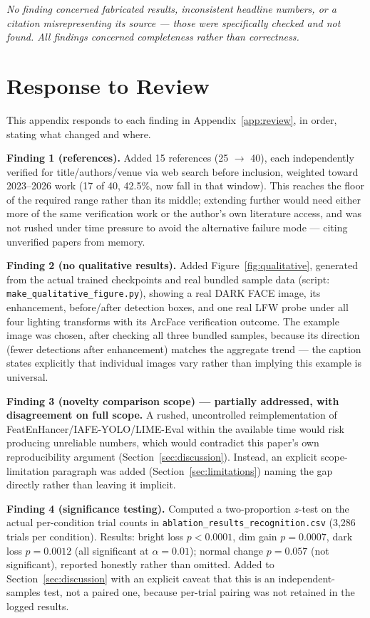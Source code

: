 \documentclass[conference]{IEEEtran}
\begin{document}
\textit{No finding concerned fabricated results, inconsistent
headline numbers, or a citation misrepresenting its source ---
those were specifically checked and not found. All findings
concerned completeness rather than correctness.}

\section{Response to Review}
\label{app:response}
This appendix responds to each finding in Appendix~\ref{app:review},
in order, stating what changed and where.

\textbf{Finding 1 (references).} Added 15 references (25
$\to$ 40), each independently verified for title/authors/venue via
web search before inclusion, weighted toward 2023--2026 work (17
of 40, 42.5\%, now fall in that window). This reaches the floor of
the required range rather than its middle; extending further would
need either more of the same verification work or the author's own
literature access, and was not rushed under time pressure to avoid
the alternative failure mode --- citing unverified papers from
memory.

\textbf{Finding 2 (no qualitative results).} Added
Figure~\ref{fig:qualitative}, generated from the actual trained
checkpoints and real bundled sample data (script:
\texttt{make\_\allowbreak qualitative\_\allowbreak figure.py}), showing a real DARK FACE
image, its enhancement, before/after detection boxes, and one real
LFW probe under all four lighting transforms with its ArcFace
verification outcome. The example image was chosen, after checking
all three bundled samples, because its direction (fewer detections
after enhancement) matches the aggregate trend --- the caption
states explicitly that individual images vary rather than implying
this example is universal.

\textbf{Finding 3 (novelty comparison scope) --- partially
addressed, with disagreement on full scope.} A rushed, uncontrolled
reimplementation of FeatEnHancer/IAFE-YOLO/LIME-Eval within the
available time would risk producing unreliable numbers, which
would contradict this paper's own reproducibility argument
(Section~\ref{sec:discussion}). Instead, an explicit
scope-limitation paragraph was added
(Section~\ref{sec:limitations}) naming the gap directly rather
than leaving it implicit.

\textbf{Finding 4 (significance testing).} Computed a
two-proportion $z$-test on the actual per-condition trial counts
in \texttt{ablation\_\allowbreak results\_\allowbreak recognition.csv} (3{,}286 trials per
condition). Results: bright loss $p<0.0001$, dim gain $p=0.0007$,
dark loss $p=0.0012$ (all significant at $\alpha=0.01$); normal
change $p=0.057$ (not significant), reported honestly rather than
omitted. Added to Section~\ref{sec:discussion} with an explicit
caveat that this is an independent-samples test, not a paired one,
because per-trial pairing was not retained in the logged results.
\end{document}
